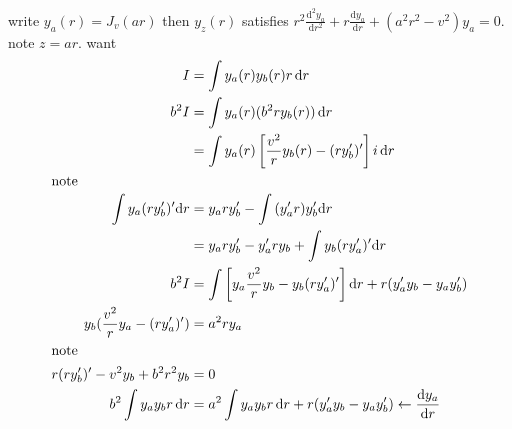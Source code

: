 \documentclass{article}
\begin{document}
write $y_a(r)=J_v(ar)$ then $y_z(r)$ satisfies $r^2\frac{\mathrm{d}^2y_a}{\mathrm{d}r^2}+r\frac{\mathrm{d}y_a}{\mathrm{d}r}+(a^2r^2-v^2)y_a=0$. note $z=ar$. want
\begin{align*}
  I&=\int{y_a(r)y_b(r)r\,\mathrm{d}r}\\
  b^2I&=\int{y_a(r)(b^2ry_b(r))\,\mathrm{d}r}\\
  &=\int{y_a(r)\left[\frac{v^2}{r}y_b(r)-(ry_b')'\right]i\,\mathrm{d}r}\\
  \intertext{note}
  \int{y_a(ry_b')'\mathrm{d}r}&=y_ary_b'-\int{(y_a'r)y_b'\mathrm{d}r}\\
  &=y_ary_b'-y_a'ry_b+\int{y_b(ry_a')'\mathrm{d}r}\\
  b^2I&=\int{\left[y_a\frac{v^2}{r}y_b-y_b(ry_a')'\right]\mathrm{d}r}+r(y_a'y_b-y_ay_b')\\
  y_b(\frac{v^2}{r}y_a-(ry_a')')&=a^2ry_a\\
  \intertext{note}
  r(ry_b')'-v^2y_b+b^2r^2y_b&=0\\
  b^2\int{y_ay_br\,\mathrm{d}r}&=a^2\int{y_ay_br\,\mathrm{d}r}+r(y_a'y_b-y_ay_b')\leftarrow\frac{\mathrm{d}y_a}{\mathrm{d}r}
\end{align*}
\end{document}
